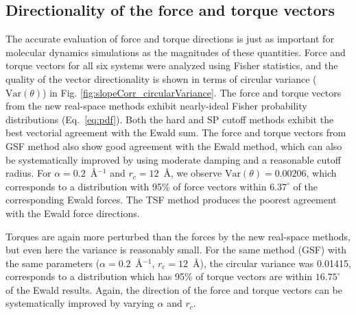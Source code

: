 \subsection{Directionality of the force and torque vectors}   

The accurate evaluation of force and torque directions is just as
important for molecular dynamics simulations as the magnitudes of
these quantities. Force and torque vectors for all six systems were
analyzed using Fisher statistics, and the quality of the vector
directionality is shown in terms of circular variance
($\mathrm{Var}(\theta)$) in
Fig. \ref{fig:slopeCorr_circularVariance}. The force and torque
vectors from the new real-space methods exhibit nearly-ideal Fisher
probability distributions (Eq.~\ref{eq:pdf}). Both the hard and SP
cutoff methods exhibit the best vectorial agreement with the Ewald
sum. The force and torque vectors from GSF method also show good
agreement with the Ewald method, which can also be systematically
improved by using moderate damping and a reasonable cutoff radius. For
$\alpha = 0.2$~\AA$^{-1}$ and $r_c = 12$~\AA, we observe
$\mathrm{Var}(\theta) = 0.00206$, which corresponds to a distribution
with 95\% of force vectors within $6.37^\circ$ of the corresponding
Ewald forces. The TSF method produces the poorest agreement with the
Ewald force directions.

Torques are again more perturbed than the forces by the new real-space
methods, but even here the variance is reasonably small.  For the same
method (GSF) with the same parameters ($\alpha = 0.2$~\AA$^{-1}$, $r_c
= 12$~\AA), the circular variance was 0.01415, corresponds to a
distribution which has 95\% of torque vectors are within $16.75^\circ$
of the Ewald results. Again, the direction of the force and torque
vectors can be systematically improved by varying $\alpha$ and $r_c$.

